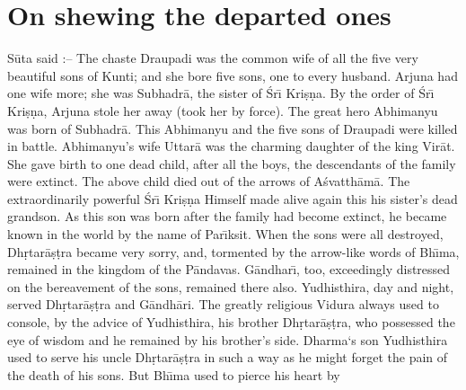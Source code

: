 \chapter{On shewing the departed ones}

S\=uta said :-- The chaste Draupadi was the common wife of all the five very beautiful sons of Kunti; and she bore five sons, one to every husband. Arjuna had one wife more; she was Subhadr\=a, the sister of \'Sr\={\i} Kri\d{s}\d{n}a. By the order of \'Sr\={\i} Kri\d{s}\d{n}a, Arjuna stole her away (took her by force). The great hero Abhimanyu was born of Subhadr\=a. This Abhimanyu and the five sons of Draupadi were killed in battle. Abhimanyu's wife Uttar\=a was the charming daughter of the king Vir\=at. She gave birth to one dead child, after all the boys, the descendants of the family were extinct. The above child died out of the arrows of A\'svatth\=am\=a. The extraordinarily powerful \'Sr\={\i} Kri\d{s}\d{n}a Himself made alive again this his sister's dead grandson. As this son was born after the family had become extinct, he became known in the world by the name of Par\={\i}ksit. When the sons were all destroyed, Dh\d{r}tar\=a\d{s}\d{t}ra became very sorry, and, tormented by the arrow-like words of Bh\={\i}ma, remained in the kingdom of the P\=andavas. G\=andhar\={\i}, too, exceedingly distressed on the bereavement of the sons, remained there also. Yudhisthira, day and night, served Dh\d{r}tar\=a\d{s}\d{t}ra and G\=andh\=ari. The greatly religious Vidura always used to console, by the advice of Yudhisthira, his brother Dh\d{r}tar\=a\d{s}\d{t}ra, who possessed the eye of wisdom and he remained by his brother's side. Dharma`s son Yudhisthira used to serve his uncle Dh\d{r}tar\=a\d{s}\d{t}ra in such a way as he might forget the pain of the death of his sons. But Bh\={\i}ma used to pierce his heart by

